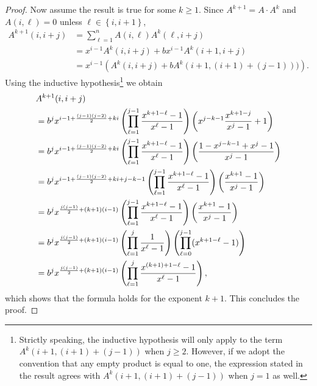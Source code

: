 \documentclass[9pt,lineno]{elife}
\begin{document}
\begin{appendixbox}
\begin{proof}
Now assume the result is true for some $k \ge 1$.  Since $A^{k+1} = A \cdot A^{k}$ and $A(i,\ell)=0$ unless $\ell \in \left\{ i , i+1 \right\}$,
\small
\[
\begin{split}
A^{k+1}(i,i+j) &= \sum_{\ell=1}^n A(i,\ell) A^k(\ell, i+j) \\
  &= x^{i-1}A^k(i, i + j) + b x^{i-1}A^k(i+1,i+j) \\
  &= x^{i-1} \left( A^k(i,i+j) + bA^k(i+1,(i+1)+(j-1))) \right).
\end{split}
\]
\normalsize
Using the inductive hypothesis\footnote{Strictly speaking, the inductive hypothesis will only apply to the term $A^k(i+1,(i+1)+(j-1))$ when $j \ge 2$.  However, if we adopt the convention that any empty product is equal to one, the expression stated in the result agrees with $A^k(i+1,(i+1)+(j-1))$ when $j=1$ as well.} we obtain
\small
\[
\begin{split}\hspace{-1.0cm}
& A^{k+1}(i, i+j)\\ 
& = b^j x^{i-1 + \frac{(j-1)(j-2)}{2}+ki} \left( \prod_{\ell=1}^{j-1} \frac{x^{k+1-\ell}-1}{x^{\ell}-1} \right) \left(x^{j-k-1}\frac{x^{k+1-j}}{x^j-1}+1  \right)\\
   &=b^j x^{i-1 + \frac{(j-1)(j-2)}{2}+ki} \left( \prod_{\ell=1}^{j-1} \frac{x^{k+1-\ell}-1}{x^{\ell}-1} \right) \left( \frac{1-x^{j-k-1}+x^j-1}{x^j-1}  \right)\\
   &=b^j x^{i-1 + \frac{(j-1)(j-2)}{2}+ki + j-k-1} \left( \prod_{\ell=1}^{j-1} \frac{x^{k+1-\ell}-1}{x^{\ell}-1} \right) \left( \frac{x^{k+1}-1}{x^j-1}  \right)\\
   &=b^j x^{\frac{j(j-1)}{2} + (k+1)(i-1)}  \left( \prod_{\ell=1}^{j-1} \frac{x^{k+1-\ell}-1}{x^{\ell}-1} \right) \left( \frac{x^{k+1}-1}{x^j-1}  \right) \\
   &=b^j x^{\frac{j(j-1)}{2} + (k+1)(i-1)}  \left( \prod_{\ell=1}^{j} \frac{1}{x^{\ell}-1} \right) \left(\prod_{\ell=0}^{j-1} (x^{k+1-\ell}-1)  \right) \\
   &= b^j x^{\frac{j(j-1)}{2} + (k+1)(i-1)}  \left( \prod_{\ell=1}^{j} \frac{x^{(k+1) + 1-\ell} -1}{x^{\ell}-1} \right), 
\end{split}
\]
\normalsize
which shows that the formula holds for the exponent $k+1$.  This concludes the proof.
\end{proof}



\end{appendixbox}
\end{document}
